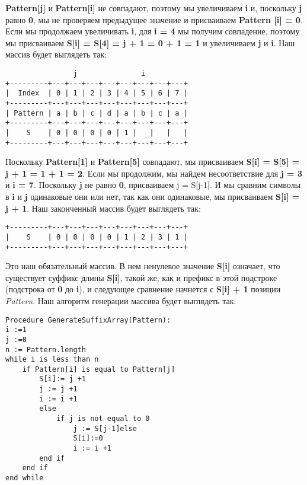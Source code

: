 \textbf{Pattern[j]} и \textbf{Pattern[i]} не совпадают, поэтому мы увеличиваем \textbf{i} и, поскольку \textbf{j} равно \textbf{0}, мы не проверяем
предыдущее значение и присваиваем \textbf{Pattern [i] = 0}. Если мы продолжаем увеличивать \textbf{i}, для \textbf{i = 4} мы
получим совпадение, поэтому мы присваиваем \textbf{S[i] = S[4] = j + 1 = 0 + 1 = 1} и увеличиваем \textbf{j} и \textbf{i}. Наш массив будет выглядеть так:
\vspace{\baselineskip}
\begin{tcolorbox}
\begin{verbatim}
                j               i
+---------+---+---+---+---+---+---+---+---+
|  Index  | 0 | 1 | 2 | 3 | 4 | 5 | 6 | 7 |
+---------+---+---+---+---+---+---+---+---+
| Pattern | a | b | c | d | a | b | c | a |
+---------+---+---+---+---+---+---+---+---+
|    S    | 0 | 0 | 0 | 0 | 1 |   |   |   |
+---------+---+---+---+---+---+---+---+---+
\end{verbatim}

\end{tcolorbox}
\vspace{\baselineskip}
Поскольку \textbf{Pattern[1]} и \textbf{Pattern[5]} совпадают, мы присваиваем \textbf{S[i] = S[5] = j + 1 = 1 + 1 = 2}. Если мы
продолжим, мы найдем несоответствие для \textbf{j = 3} и \textbf{i = 7}. Поскольку \textbf{j} не равно \textbf{0}, присваиваем j = S[j-1].
И мы сравним символы в \textbf{i} и \textbf{j} одинаковые они или нет, так как они одинаковые, мы присваиваем \textbf{S[i] = j
+ 1}. Наш законченный массив будет выглядеть так:
\vspace{\baselineskip}
\begin{tcolorbox}
\begin{verbatim}
+---------+---+---+---+---+---+---+---+---+
|    S    | 0 | 0 | 0 | 0 | 1 | 2 | 3 | 1 |
+---------+---+---+---+---+---+---+---+---+
\end{verbatim}
\end{tcolorbox}
\vspace{\baselineskip}
Это наш обязательный массив. В нем ненулевое значение \textbf{S[i]} означает, что существует суффикс длины
\textbf{S[i]}, такой же, как и префикс в этой подстроке (подстрока от \textbf{0} до \textbf{i}), и следующее сравнение начнется с
\textbf{S[i] + 1} позиции \textit{Pattern}. Наш алгоритм генерации массива будет выглядеть так:
\vspace{\baselineskip}
\begin{tcolorbox}
\begin{verbatim} 
Procedure GenerateSuffixArray(Pattern):
i :=1
j :=0
n := Pattern.length
while i is less than n
	if Pattern[i] is equal to Pattern[j]
		S[i]:= j +1
		j := j +1
		i := i +1
		else
			if j is not equal to 0
				j := S[j-1]else
				S[i]:=0 
				i := i +1
		end if 
	end if
end while
\end{verbatim}
\end{tcolorbox}
